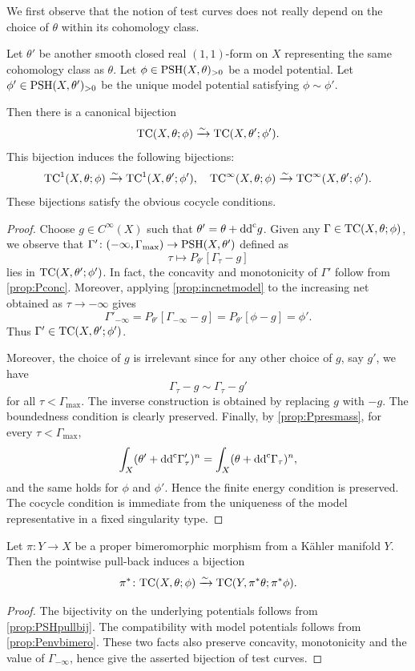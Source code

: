 We first observe that the notion of test curves does not really depend on the choice of $\theta$ within its cohomology class.
\begin{proposition}\label{prop:testcurveindeptheta}
    Let $\theta'$ be another smooth closed real $(1,1)$-form on $X$ representing the same cohomology class as $\theta$. Let $\phi\in \mathrm{PSH}(X,\theta)_{>0}$ be a model potential. Let $\phi'\in \mathrm{PSH}(X,\theta')_{>0}$ be the unique model potential satisfying $\phi\sim\phi'$.

    Then there is a canonical bijection
    \[
    \mathrm{TC}(X,\theta;\phi)\xrightarrow{\sim} \mathrm{TC}(X,\theta';\phi').
    \]
    This bijection induces the following bijections:
    \[
    \mathrm{TC}^1(X,\theta;\phi)\xrightarrow{\sim}\mathrm{TC}^1(X,\theta';\phi'),\quad \mathrm{TC}^{\infty}(X,\theta;\phi)\xrightarrow{\sim}\mathrm{TC}^{\infty}(X,\theta';\phi').
    \]
    These bijections satisfy the obvious cocycle conditions.
\end{proposition}
\begin{proof}
    Choose $g\in C^{\infty}(X)$ such that $\theta'=\theta+\mathrm{dd}^{\mathrm{c}} g$. Given any $\Gamma\in \mathrm{TC}(X,\theta;\phi)$, we observe that $\Gamma'\colon (-\infty,\Gamma_{\max})\rightarrow \mathrm{PSH}(X,\theta')$ defined as
    \[
    \tau\mapsto P_{\theta'}[\Gamma_{\tau}-g]
    \]
    lies in $\mathrm{TC}(X,\theta';\phi')$. In fact, the concavity and monotonicity of $\Gamma'$ follow from \cref{prop:Pconc}. Moreover, applying \cref{prop:incnetmodel} to the increasing net obtained as $\tau\to -\infty$ gives
    \[
        \Gamma'_{-\infty}=P_{\theta'}[\Gamma_{-\infty}-g]=P_{\theta'}[\phi-g]=\phi'.
    \]
    Thus $\Gamma'\in \mathrm{TC}(X,\theta';\phi')$.
    
    Moreover, the choice of $g$ is irrelevant since for any other choice of $g$, say $g'$, we have
    \[
    \Gamma_{\tau}-g\sim \Gamma_{\tau}-g'
    \]
    for all $\tau<\Gamma_{\max}$. The inverse construction is obtained by replacing $g$ with $-g$. The boundedness condition is clearly preserved. Finally, by \cref{prop:Ppresmass}, for every $\tau<\Gamma_{\max}$,
    \[
        \int_X(\theta'+\mathrm{dd}^{\mathrm{c}} \Gamma'_\tau)^n=\int_X(\theta+\mathrm{dd}^{\mathrm{c}} \Gamma_\tau)^n,
    \]
    and the same holds for $\phi$ and $\phi'$. Hence the finite energy condition is preserved. The cocycle condition is immediate from the uniqueness of the model representative in a fixed singularity type.
\end{proof}


\begin{proposition}\label{prop:ETCbimero}
    Let $\pi\colon Y\rightarrow X$ be a proper bimeromorphic morphism from a K\"ahler manifold $Y$. Then the pointwise pull-back induces a bijection
    \[
    \pi^*\colon \mathrm{TC}(X,\theta;\phi)\xrightarrow[]{\sim} \mathrm{TC}(Y,\pi^*\theta;\pi^*\phi).
    \]
\end{proposition}
\begin{proof}
     The bijectivity on the underlying potentials follows from \cref{prop:PSHpullbij}. The compatibility with model potentials follows from \cref{prop:Penvbimero}. These two facts also preserve concavity, monotonicity and the value of $\Gamma_{-\infty}$, hence give the asserted bijection of test curves.
\end{proof}

